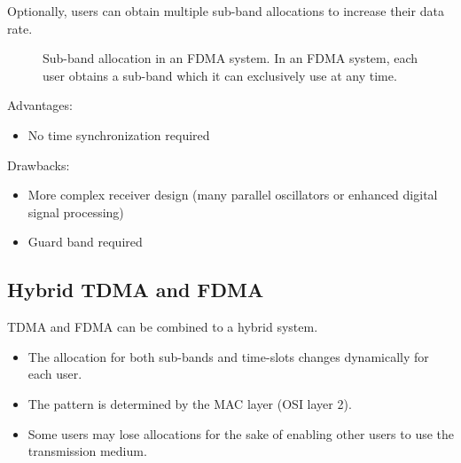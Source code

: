 \begin{refsection}
\begin{remark}
	Optionally, users can obtain multiple sub-band allocations to increase their data rate.
\end{remark}

\begin{figure}[H]
	\centering
	\caption[Sub-band allocation in an \acs{FDMA} system]{Sub-band allocation in an \acs{FDMA} system. In an \acs{FDMA} system, each user obtains a sub-band which it can exclusively use at any time.}
\end{figure}

Advantages:
\begin{itemize}
	\item No time synchronization required
\end{itemize}

Drawbacks:
\begin{itemize}
	\item More complex receiver design (many parallel oscillators or enhanced digital signal processing)
	\item Guard band required
\end{itemize}

\subsection{Hybrid TDMA and FDMA}

\ac{TDMA} and \ac{FDMA} can be combined to a hybrid system.
\begin{itemize}
	\item The allocation for both sub-bands and time-slots changes dynamically for each user.
	\item The pattern is determined by the \ac{MAC} layer (\acs{OSI} layer 2).
	\item Some users may lose allocations for the sake of enabling other users to use the transmission medium.
\end{itemize}


\end{refsection}
